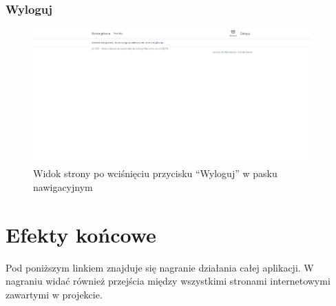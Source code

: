 \documentclass{article}
\begin{document}
\subsubsection{Wyloguj}
\begin{figure}[H]
   \centering
   \includegraphics[width=0.95\textwidth,frame]{Wyglad/wylogowanie_admin.png}
   \caption{Widok strony po wciśnięciu przycisku ``Wyloguj'' w pasku nawigacyjnym}
\end{figure}

\section{Efekty końcowe}
Pod poniższym linkiem znajduje się nagranie działania całej aplikacji. W nagraniu widać również przejścia między wszystkimi stronami internetowymi zawartymi w projekcie.
\end{document}
